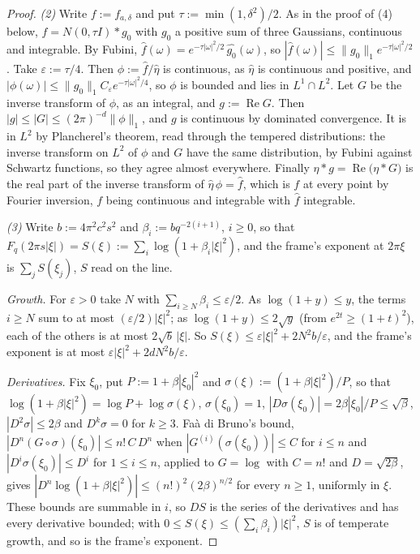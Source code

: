 \begin{proof}
\emph{(2)} Write $f := f_{a,\delta}$ and put $\tau := \min(1, \delta^2)/2$. As in the proof of (4)
below, $f = N(0, \tau I) * g_0$ with $g_0$ a positive sum of three Gaussians, continuous and
integrable. By Fubini, $\widehat f(\omega) = e^{-\tau|\omega|^2/2}\,\widehat{g_0}(\omega)$, so
$|\widehat f(\omega)| \le \|g_0\|_1e^{-\tau|\omega|^2/2}$. Take $\varepsilon := \tau/4$. Then
$\phi := \widehat f/\widehat\eta$ is continuous, as $\widehat\eta$ is continuous and positive, and
$|\phi(\omega)| \le \|g_0\|_1C_\varepsilon e^{-\tau|\omega|^2/4}$, so $\phi$ is bounded and lies in
$L^1 \cap L^2$. Let $G$ be the inverse transform of $\phi$, as an integral, and
$g := \operatorname{Re}G$. Then $|g| \le |G| \le (2\pi)^{-d}\|\phi\|_1$, and $g$ is continuous by
dominated convergence. It is in $L^2$ by Plancherel's theorem, read through the tempered
distributions: the inverse transform on $L^2$ of $\phi$ and $G$ have the same distribution, by
Fubini against Schwartz functions, so they agree almost everywhere. Finally
$\eta * g = \operatorname{Re}\bigl(\eta * G\bigr)$ is the real part of the inverse transform of
$\widehat\eta\,\phi = \widehat f$, which is $f$ at every point by Fourier inversion, $f$ being
continuous and integrable with $\widehat f$ integrable.

\emph{(3)} Write $b := 4\pi^2c^2s^2$ and $\beta_i := bq^{-2(i+1)}$, $i \ge 0$, so that
$F_q(2\pi s|\xi|) = S(\xi) := \sum_i\log(1 + \beta_i|\xi|^2)$, and the frame's exponent at
$2\pi\xi$ is $\sum_jS(\xi_j)$, $S$ read on the line.

\emph{Growth.} For $\varepsilon > 0$ take $N$
with $\sum_{i \ge N}\beta_i \le \varepsilon/2$. As $\log(1 + y) \le y$, the terms $i \ge N$ sum to
at most $(\varepsilon/2)|\xi|^2$; as $\log(1 + y) \le 2\sqrt y$ (from $e^{2t} \ge (1 + t)^2$), each
of the others is at most $2\sqrt b\,|\xi|$. So $S(\xi) \le \varepsilon|\xi|^2 + 2N^2b/\varepsilon$,
and the frame's exponent is at most $\varepsilon|\xi|^2 + 2dN^2b/\varepsilon$.

\emph{Derivatives.}
Fix $\xi_0$, put $P := 1 + \beta|\xi_0|^2$ and $\sigma(\xi) := (1 + \beta|\xi|^2)/P$, so that
$\log(1 + \beta|\xi|^2) = \log P + \log\sigma(\xi)$, $\sigma(\xi_0) = 1$, $|D\sigma(\xi_0)| =
2\beta|\xi_0|/P \le \sqrt\beta$, $|D^2\sigma| \le 2\beta$ and $D^k\sigma = 0$ for $k \ge 3$. Faà di
Bruno's bound, $|D^n(G \circ \sigma)(\xi_0)| \le n!\,C\,D^n$ when $|G^{(i)}(\sigma(\xi_0))| \le C$
for $i \le n$ and $|D^i\sigma(\xi_0)| \le D^i$ for $1 \le i \le n$, applied to $G = \log$ with $C = n!$ and
$D = \sqrt{2\beta}$, gives $|D^n\log(1 + \beta|\xi|^2)| \le (n!)^2(2\beta)^{n/2}$ for every
$n \ge 1$, uniformly in $\xi$. These bounds are summable in $i$, so $DS$ is the series of the
derivatives and has every derivative bounded; with $0 \le S(\xi) \le (\sum_i\beta_i)|\xi|^2$, $S$ is
of temperate growth, and so is the frame's exponent.


\end{proof}
